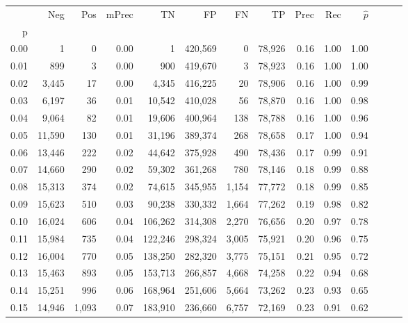 \begin{tabular}{rrrrrrrrrrrrrr}
\toprule
{} &     Neg &    Pos & mPrec &       TN &       FP &      FN &      TP &  Prec &   Rec & $\hat{p}$ \\
p    &         &        &       &          &          &         &         &       &       &           \\
\midrule
0.00 &       1 &      0 &  0.00 &        1 &  420,569 &       0 &  78,926 &  0.16 &  1.00 &      1.00 \\
0.01 &     899 &      3 &  0.00 &      900 &  419,670 &       3 &  78,923 &  0.16 &  1.00 &      1.00 \\
0.02 &   3,445 &     17 &  0.00 &    4,345 &  416,225 &      20 &  78,906 &  0.16 &  1.00 &      0.99 \\
0.03 &   6,197 &     36 &  0.01 &   10,542 &  410,028 &      56 &  78,870 &  0.16 &  1.00 &      0.98 \\
0.04 &   9,064 &     82 &  0.01 &   19,606 &  400,964 &     138 &  78,788 &  0.16 &  1.00 &      0.96 \\
0.05 &  11,590 &    130 &  0.01 &   31,196 &  389,374 &     268 &  78,658 &  0.17 &  1.00 &      0.94 \\
0.06 &  13,446 &    222 &  0.02 &   44,642 &  375,928 &     490 &  78,436 &  0.17 &  0.99 &      0.91 \\
0.07 &  14,660 &    290 &  0.02 &   59,302 &  361,268 &     780 &  78,146 &  0.18 &  0.99 &      0.88 \\
0.08 &  15,313 &    374 &  0.02 &   74,615 &  345,955 &   1,154 &  77,772 &  0.18 &  0.99 &      0.85 \\
0.09 &  15,623 &    510 &  0.03 &   90,238 &  330,332 &   1,664 &  77,262 &  0.19 &  0.98 &      0.82 \\
0.10 &  16,024 &    606 &  0.04 &  106,262 &  314,308 &   2,270 &  76,656 &  0.20 &  0.97 &      0.78 \\
0.11 &  15,984 &    735 &  0.04 &  122,246 &  298,324 &   3,005 &  75,921 &  0.20 &  0.96 &      0.75 \\
0.12 &  16,004 &    770 &  0.05 &  138,250 &  282,320 &   3,775 &  75,151 &  0.21 &  0.95 &      0.72 \\
0.13 &  15,463 &    893 &  0.05 &  153,713 &  266,857 &   4,668 &  74,258 &  0.22 &  0.94 &      0.68 \\
0.14 &  15,251 &    996 &  0.06 &  168,964 &  251,606 &   5,664 &  73,262 &  0.23 &  0.93 &      0.65 \\
0.15 &  14,946 &  1,093 &  0.07 &  183,910 &  236,660 &   6,757 &  72,169 &  0.23 &  0.91 &      0.62 \\

\end{tabular}
